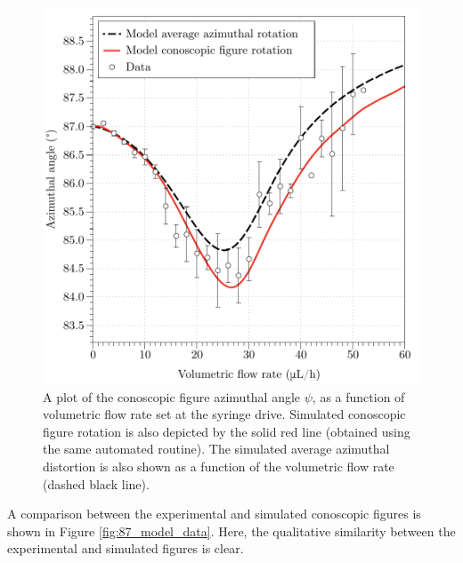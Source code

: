 \begin{figure}
\begin{center}
\includegraphics{Figures/90/uniform_data_plot}
\end{center}
\caption[Plot of experimental conoscopic figure rotation as a function of flow rate]{\label{fig:uniform_data_plot}A plot of the conoscopic figure azimuthal angle $\psi$, as a function of volumetric flow rate set at the syringe drive. Simulated conoscopic figure rotation is also depicted by the solid red line (obtained using the same automated routine). The simulated average azimuthal distortion is also shown as a function of the volumetric flow rate (dashed black line).}
\end{figure}

A comparison between the experimental and simulated conoscopic figures is shown in Figure \ref{fig:87_model_data}. Here, the qualitative similarity between the experimental and simulated figures is clear.

